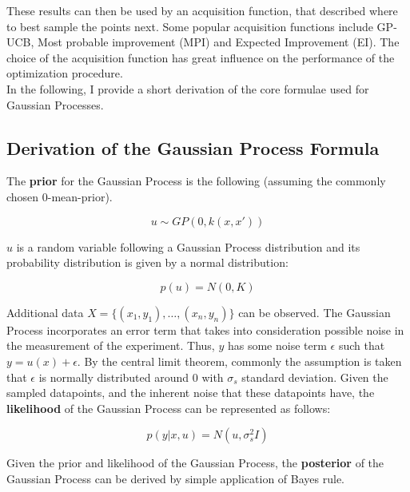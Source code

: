 These results can then be used by an acquisition function, that described where to best sample the points next.
Some popular acquisition functions include GP-UCB, Most probable improvement (MPI) and Expected Improvement (EI).
The choice of the acquisition function has great influence on the performance of the optimization procedure.\\

In the following, I provide a short derivation of the core formulae used for Gaussian Processes.

\subsection{Derivation of the Gaussian Process Formula}
The \textbf{prior} for the Gaussian Process is the following (assuming the commonly chosen 0-mean-prior).

\begin{equation}
u \sim GP(0, k(x, x'))
\end{equation}

$u$ is a random variable following a Gaussian Process distribution and its probability distribution is given by a normal distribution:

\begin{equation}
p(u) = N ( 0, K )
\end{equation}

Additional data $ X = \{ (x_1, y_1), \ldots, (x_n, y_n) \} $ can be observed.
The Gaussian Process incorporates an error term that takes into consideration possible noise in the measurement of the experiment.
Thus, $y$ has some noise term $\epsilon$ such that $y = u(x) + \epsilon$.
By the central limit theorem, commonly the assumption is taken that $\epsilon$ is normally distributed around $0$ with $\sigma_s$ standard deviation.
Given the sampled datapoints, and the inherent noise that these datapoints have, the \textbf{likelihood} of the Gaussian Process can be represented as follows:

\begin{equation}
p(y | x, u) = N (u, \sigma_s^2 I)
\end{equation}


Given the prior and likelihood of the Gaussian Process, the \textbf{posterior} of the Gaussian Process can be derived by simple application of Bayes rule.


